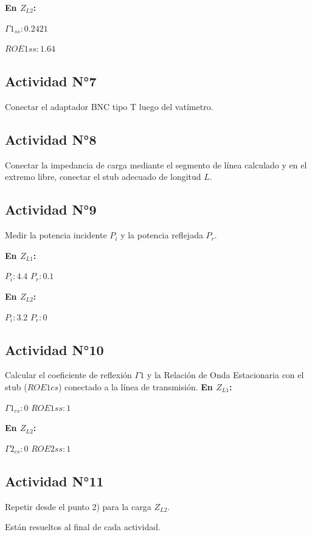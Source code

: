 \documentclass[12pt]{article}
\begin{document}
\textbf{En $Z_{L2}$:}

$\Gamma 1_{ss}:0.2421$

$ROE1ss:1.64$

\subsection{Actividad N°7}
Conectar el adaptador BNC tipo T luego del vatímetro.

\subsection{Actividad N°8}
Conectar la impedancia de carga mediante el segmento de línea calculado y en el extremo libre, conectar el stub
adecuado de longitud $L$.

\subsection{Actividad N°9}
Medir la potencia incidente $P_i$ y la potencia reflejada $P_r$.

\textbf{En $Z_{L1}$:}

$P_i:4.4 $
$P_r:0.1 $

\textbf{En $Z_{L2}$:}

$P_i:3.2 $
$P_r:0 $

\subsection{Actividad N°10}
 Calcular el coeficiente de reflexión $\Gamma 1$  y la Relación de Onda Estacionaria con el stub
 ($ROE1cs$) conectado a la línea de transmisión.
\textbf{En $Z_{L1}$:}

 $\Gamma 1_{cs}:0$
 $ROE1ss: 1$

 \textbf{En $Z_{L2}$:}
 
 $\Gamma 2_{cs}:0$
 $ROE2ss: 1$
\subsection{Actividad N°11}
 Repetir desde el punto 2) para la carga $Z_{L2}$.
 
 Est\'an resueltos al final de cada actividad.
 
\end{document}
